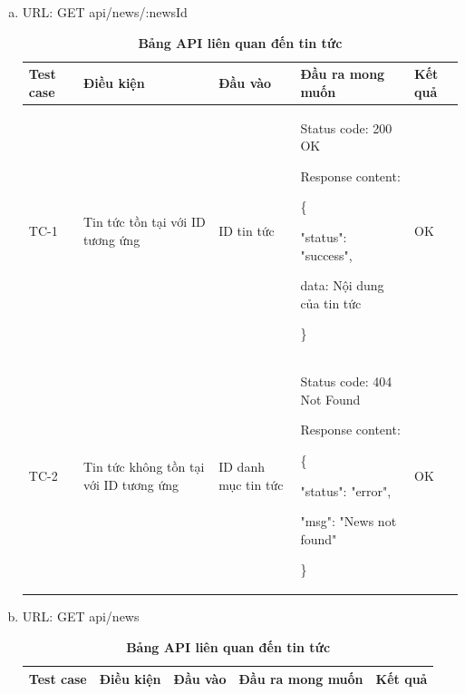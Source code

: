 \begin{enumerate}[a)]
  \item URL: GET api/news/{:newsId}
  


  \begin{xltabular}{\textwidth}{
    | >{\raggedright\arraybackslash}m{1cm}
    | >{\raggedright\arraybackslash}X
    | >{\raggedright\arraybackslash}X
    | >{\raggedright\arraybackslash}X
    | >{\raggedright\arraybackslash}m{1cm}|
    }
    \caption{\bfseries \fontsize{12pt}{0pt}\selectfont Bảng API liên quan đến tin tức}
    \\
    \hline
    \bfseries Test case    &\bfseries Điều kiện   &\bfseries Đầu vào 
    &\bfseries Đầu ra mong muốn &\bfseries Kết quả\\ \hline
  
  
    TC-1
    & Tin tức tồn tại với ID tương ứng
    & ID tin tức
    & 
  
    Status code: 200 OK
  
      Response content:
  
      \{
  
    "status": "success",

    data: Nội dung của tin tức
  
    \}
    
    & OK
  
    \\ \hline
  
    TC-2
    & Tin tức không tồn tại với ID tương ứng
    & ID danh mục tin tức
   &
  
    Status code: 404 Not Found
  
      Response content:
  
      \{
  
    "status": "error",
  
    "msg": "News not found"
  
    \}
    
    & OK
  
    \\ \hline

  
    \end{xltabular}



  \item URL: GET api/news
  

  \begin{xltabular}{\textwidth}{
    | >{\raggedright\arraybackslash}m{1cm}
    | >{\raggedright\arraybackslash}X
    | >{\raggedright\arraybackslash}X
    | >{\raggedright\arraybackslash}X
    | >{\raggedright\arraybackslash}m{1cm}|
    }
    \caption{\bfseries \fontsize{12pt}{0pt}\selectfont Bảng API liên quan đến tin tức}
    \\
    \hline
    \bfseries Test case    &\bfseries Điều kiện   &\bfseries Đầu vào 
    &\bfseries Đầu ra mong muốn &\bfseries Kết quả\\ \hline
  

\end{xltabular}
\end{enumerate}

